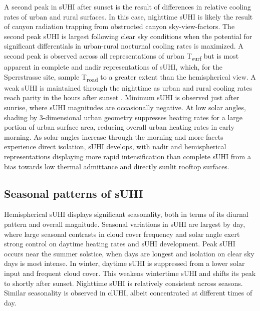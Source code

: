 \begin{bibunit}
A second peak in sUHI after sunset is the result of differences in relative cooling rates of urban and rural surfaces. In this case, nighttime sUHI is likely the result of canyon radiation trapping from obstructed canyon sky-view-factors. The second peak sUHI is largest following clear sky conditions when the potential for significant differentials in urban-rural nocturnal cooling rates is maximized. A second peak is observed across all representations of urban T\textsubscript{surf} but is most apparent in complete and nadir representations of sUHI, which, for the Sperrstrasse site, sample T\textsubscript{road} to a greater extent than the hemispherical view. A weak sUHI is maintained through the nighttime as urban and rural cooling rates reach parity in the hours after sunset \citep{Oke2017}. Minimum sUHI is observed just after sunrise, where sUHI magnitudes are occasionally negative. At low solar angles, shading by 3-dimensional urban geometry suppresses heating rates for a large portion of urban surface area, reducing overall urban heating rates in early morning. As solar angles increase through the morning and more facets experience direct isolation, sUHI develops, with nadir and hemispherical representations displaying more rapid intensification than complete sUHI from a bias towards low thermal admittance and directly sunlit rooftop surfaces.

\subsection{Seasonal patterns of sUHI}

Hemispherical sUHI displays significant seasonality, both in terms of its diurnal pattern and overall magnitude. Seasonal variations in sUHI are largest by day, where large seasonal contrasts in cloud cover frequency and solar angle exert strong control on daytime heating rates and sUHI development. Peak sUHI occurs near the summer solstice, when days are longest and isolation on clear sky days is most intense. In winter, daytime sUHI is suppressed from a lower solar input and frequent cloud cover. This weakens wintertime sUHI and shifts its peak to shortly after sunset. Nighttime sUHI is relatively consistent across seasons. Similar seasonality is observed in clUHI, albeit concentrated at different times of day. 


\end{bibunit}
